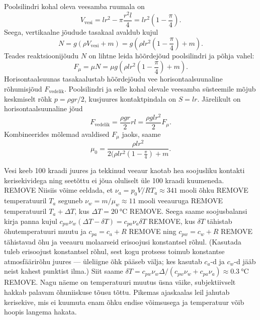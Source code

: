 \documentclass[10pt]{article}
\newcommand{\pp}[1]{REMOVE}
\begin{document}
Poolsilindri kohal oleva veesamba ruumala on
\begin{equation*}
	V_{\mathrm{vesi}}=l r^2-\pi \frac{r^2 l}{4}=l r^2\left(1-\frac{\pi}{4}\right).
\end{equation*}
Seega, vertikaalne jõudude tasakaal avaldub kujul
\begin{equation*}
	N=g(\rho V_{\mathrm{vesi}} + m) = g\left(\rho l r^2\left(1-\frac{\pi}{4}\right) + m\right).
\end{equation*}
Teades reaktsioonijõudu $N$ on lihtne leida hõõrdejõud poolsilindri ja põhja vahel:
\begin{equation*}
	F_{\mu}=\mu N= \mu g \left(\rho l r^2\left(1-\frac{\pi}{4}\right) + m\right).
\end{equation*} 
Horisontaalsuunas tasakaalustab hõõrdejõudu vee horisontaalsuunaline rõhumisjõud $F_{\mathrm{vedelik}}$. Poolsilindri ja selle kohal olevale veesamba süsteemile mõjub keskmiselt rõhk $p = \rho gr/2$, kusjuures kontaktpindala on $S = lr$. Järelikult on horisontaalsuunaline jõud
\begin{equation*}
	F_{\mathrm{vedelik}}=\frac{\rho g r}{2}r l=\frac{\rho g l r^2}{2} F_{\mu}.
\end{equation*}
Kombineerides mõlemad avaldised $F_\mu$ jaoks, saame
\begin{equation*}
	\mu_0=\frac{\rho l r^2}{2(\rho l r^2(1-\frac{\pi}{4})+m}.
\end{equation*}
\probend
\bigskip

\setAuthor{}

\solu
Vesi keeb 100 kraadi juures ja tekkinud veeaur kaotab hea soojusliku kontakti kerisekividega ning seetõttu ei jõua oluliselt üle 100 kraadi kuumeneda. \pp{2} Niisiis võime eeldada, et $\nu_a=p_0V/RT_a\approx 341$ mooli õhku \pp{1} temperatuuril $T_a$ seguneb $\nu_w=m/\mu_w\approx 11$ mooli veeauruga \pp{1} temperatuuril $T_a+\Delta T$, kus $\Delta T=\SI {20}\celsius$ \pp{1}. Seega saame soojusbalansi kirja panna kujul $c_{pw}\nu_w(\Delta T-\delta T)=c_{pa}\nu_a\delta T$ \pp{2}, kus $\delta T$ tähistab õhutemperatuuri muutu ja $c_{pa}=c_a+R$ \pp{1} ning $c_{pw}=c_w+R$ \pp{1} tähistavad õhu ja veeauru molaarseid erisoojusi konstantsel rõhul. (Kasutada tuleb erisoojust konstantsel rõhul, sest kogu protsess toimub konstantse atmosfäärirõhu juures --- üleliigne õhk pääseb välja; kes kasutab $c_a$-d ja $c_w$-d jääb neist kahest punktist ilma.) Siit saame $\delta T=c_{pw}\nu_w\Delta/(c_{pw}\nu_w+c_{pa}\nu_a)\approx\SI{0.3}\celsius$ \pp{1}. Nagu näeme on temperatuuri muutus üsna väike, subjektiivselt hakkab palavam õhuniiskuse tõusu tõttu. Pikemas ajaskaalas leil jahutab kerisekive, mis ei kuumuta enam õhku endise võimsusega ja temperatuur võib hoopis langema hakata.
\probend
\bigskip
\end{document}
